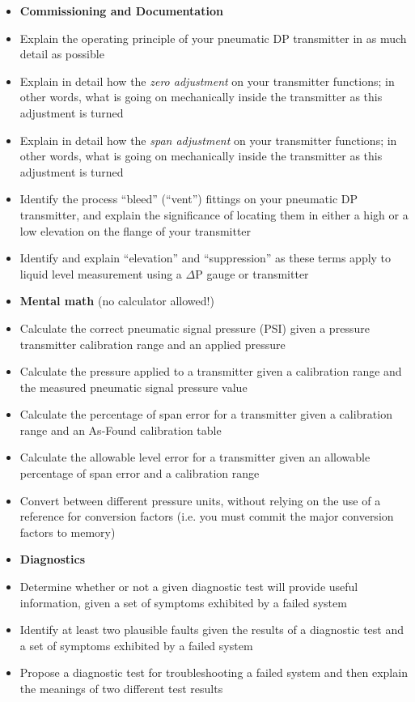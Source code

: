 {{\begin{itemize}
\item{} {\bf Commissioning and Documentation}
\item{} Explain the operating principle of your pneumatic DP transmitter in as much detail as possible
\item{} Explain in detail how the {\it zero adjustment} on your transmitter functions; in other words, what is going on mechanically inside the transmitter as this adjustment is turned
\item{} Explain in detail how the {\it span adjustment} on your transmitter functions; in other words, what is going on mechanically inside the transmitter as this adjustment is turned
\item{} Identify the process ``bleed'' (``vent'') fittings on your pneumatic DP transmitter, and explain the significance of locating them in either a high or a low elevation on the flange of your transmitter
\item{} Identify and explain ``elevation'' and ``suppression'' as these terms apply to liquid level measurement using a $\Delta$P gauge or transmitter
\end{itemize}

\filbreak

\begin{itemize}
\item{} {\bf Mental math} (no calculator allowed!)
\item{} Calculate the correct pneumatic signal pressure (PSI) given a pressure transmitter calibration range and an applied pressure 
\item{} Calculate the pressure applied to a transmitter given a calibration range and the measured pneumatic signal pressure value
\item{} Calculate the percentage of span error for a transmitter given a calibration range and an As-Found calibration table 
\item{} Calculate the allowable level error for a transmitter given an allowable percentage of span error and a calibration range
\item{} Convert between different pressure units, without relying on the use of a reference for conversion factors (i.e. you must commit the major conversion factors to memory)
\end{itemize}

\filbreak

\begin{itemize}
\item{} {\bf Diagnostics}
\item{} Determine whether or not a given diagnostic test will provide useful information, given a set of symptoms exhibited by a failed system
\item{} Identify at least two plausible faults given the results of a diagnostic test and a set of symptoms exhibited by a failed system
\item{} Propose a diagnostic test for troubleshooting a failed system and then explain the meanings of two different test results
\end{itemize}



}}
